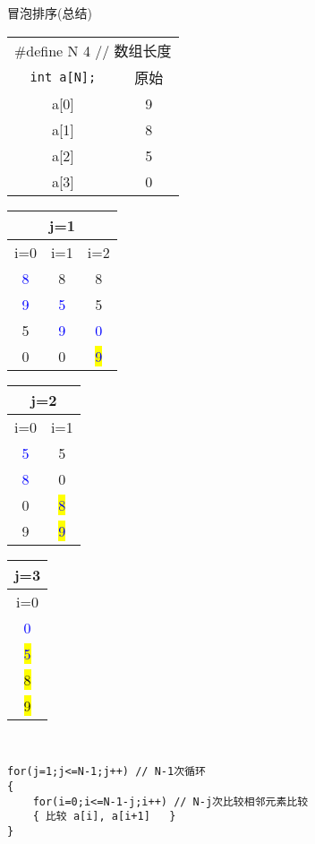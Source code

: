 \begin{frame}{冒泡排序(总结)}
\begin{tabular}{cc}
	\multicolumn{2}{c}{\#define N 4 // 数组长度}\\
	\lstinline|int a[N];| & 原始\\
	a[0] & 9\\ 
	a[1] & 8\\ 
	a[2] & 5\\ 
	a[3] & 0\\ 
\end{tabular}
\begin{tabular}{|c|c|c|}
	\hline
	\multicolumn{3}{|c|}{j=1}\\
	\hline
	i=0 & i=1 & i=2\\
	\hline
	\textcolor{blue}{8} & 8 				  & 8\\ 
	\hline 
	\textcolor{blue}{9} & \textcolor{blue}{5} & 5\\ 
	\hline 
	5 & \textcolor{blue}{9} & \textcolor{blue}{0}\\ 
	\hline
	0 & 0 & \colorbox{yellow}{\textcolor{blue}{9}}\\
	\hline 
\end{tabular}
\begin{tabular}{|c|c|}
	\hline
	\multicolumn{2}{|c|}{j=2}\\
	\hline
	i=0 & i=1\\
	\hline
	\textcolor{blue}{5} & 5\\ 
	\hline 
	\textcolor{blue}{8} & 0\\ 
	\hline 
	0 & \colorbox{yellow}{\textcolor{blue}{8}}\\ 
	\hline
	9 & \colorbox{yellow}{\textcolor{blue}{9}}\\
	\hline 
\end{tabular}
\begin{tabular}{|c|}
	\hline
	j=3\\
	\hline
	i=0\\
	\hline
	\textcolor{blue}{0}\\ 
	\hline 
	\colorbox{yellow}{\textcolor{blue}{5}}\\ 
	\hline 
	\colorbox{yellow}{8}\\ 
	\hline
	\colorbox{yellow}{9}\\
	\hline 
\end{tabular}\\ 
\begin{lstlisting}
for(j=1;j<=N-1;j++) // N-1次循环
{
	for(i=0;i<=N-1-j;i++) // N-j次比较相邻元素比较
	{ 比较 a[i], a[i+1]	}
}
\end{lstlisting}

\end{frame}
